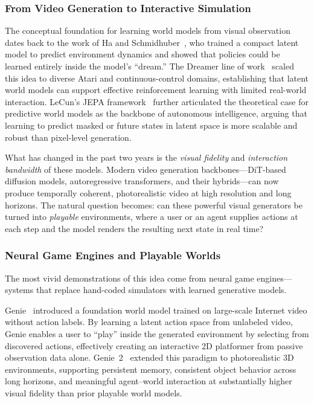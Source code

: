 \subsubsection{From Video Generation to Interactive Simulation}

The conceptual foundation for learning world models from visual observation dates back to the work of Ha and Schmidhuber~\citep{ha2018worldmodels}, who trained a compact latent model to predict environment dynamics and showed that policies could be learned entirely inside the model's ``dream.'' The Dreamer line of work~\citep{hafner2025dreamerv3} scaled this idea to diverse Atari and continuous-control domains, establishing that latent world models can support effective reinforcement learning with limited real-world interaction. LeCun's JEPA framework~\citep{lecun2022jepa} further articulated the theoretical case for predictive world models as the backbone of autonomous intelligence, arguing that learning to predict masked or future states in latent space is more scalable and robust than pixel-level generation.

What has changed in the past two years is the \emph{visual fidelity} and \emph{interaction bandwidth} of these models. Modern video generation backbones---DiT-based diffusion models, autoregressive transformers, and their hybrids---can now produce temporally coherent, photorealistic video at high resolution and long horizons. The natural question becomes: can these powerful visual generators be turned into \emph{playable} environments, where a user or an agent supplies actions at each step and the model renders the resulting next state in real time?

\subsubsection{Neural Game Engines and Playable Worlds}

The most vivid demonstrations of this idea come from neural game engines---systems that replace hand-coded simulators with learned generative models.

Genie~\citep{bruce2024genie} introduced a foundation world model trained on large-scale Internet video without action labels. By learning a latent action space from unlabeled video, Genie enables a user to ``play'' inside the generated environment by selecting from discovered actions, effectively creating an interactive 2D platformer from passive observation data alone. Genie~2~\citep{parker2024genie2} extended this paradigm to photorealistic 3D environments, supporting persistent memory, consistent object behavior across long horizons, and meaningful agent--world interaction at substantially higher visual fidelity than prior playable world models.


